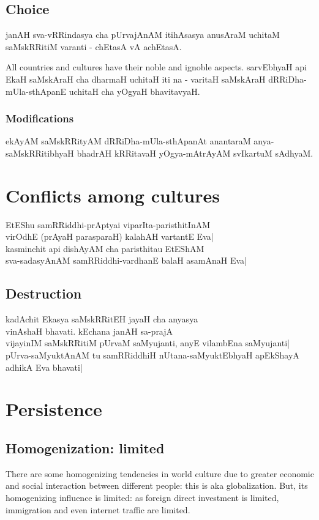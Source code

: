 \documentclass[oneside, article]{memoir}
\begin{document}
\subsection{Choice}
janAH sva-vRRindasya cha pUrvajAnAM itihAsasya anusAraM uchitaM saMskRRitiM varanti - chEtasA vA achEtasA.

All countries and cultures have their noble and ignoble aspects. sarvEbhyaH api EkaH saMskAraH cha dharmaH uchitaH iti na - varitaH saMskAraH dRRiDha-mUla-sthApanE uchitaH cha yOgyaH bhavitavyaH.

\subsubsection{Modifications}
ekAyAM saMskRRityAM dRRiDha-mUla-sthApanAt anantaraM anya-saMskRRitibhyaH bhadrAH kRRitavaH yOgya-mAtrAyAM svIkartuM sAdhyaM.

\section{Conflicts among cultures}
EtEShu samRRiddhi-prAptyai viparIta-paristhitInAM \\
virOdhE (prAyaH parasparaH) kalahAH vartantE Eva|\\
kasminchit api dishAyAM cha paristhitau EtEShAM \\
sva-sadasyAnAM samRRiddhi-vardhanE balaH asamAnaH Eva|

\subsection{Destruction}
kadAchit Ekasya saMskRRitEH jayaH cha anyasya \\
vinAshaH bhavati. kEchana janAH sa-prajA \\
vijayinIM saMskRRitiM pUrvaM saMyujanti, anyE vilambEna saMyujanti| \\
pUrva-saMyuktAnAM tu samRRiddhiH nUtana-saMyuktEbhyaH apEkShayA adhikA Eva bhavati|

\section{Persistence}
\subsection{Homogenization: limited}
There are some homogenizing tendencies in world culture due to greater economic and social interaction between different people: this is aka globalization. But, its homogenizing influence is limited: as foreign direct investment is limited, immigration and even internet traffic are limited.
\end{document}
